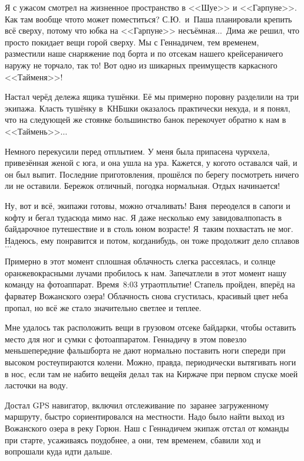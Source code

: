 Я с ужасом смотрел на жизненное пространство в <<Шуе>> и <<Гарпуне>>. Как там вообще что\sdash то может поместиться? С.Ю.~и~Паша планировали крепить всё сверху, потому что юбка на <<Гарпуне>> несъёмная$\ldots$~Дима же решил, что просто покидает вещи горой сверху. Мы с Геннадичем, тем временем, разместили наше снаряжение под борта и по отсекам нашего крейсера\mdash ничего наружу не торчало, так то! Вот одно из шикарных преимуществ каркасного <<Тайменя>>!

Настал черёд дележа ящика тушёнки. Её мы примерно поровну разделили на три экипажа. Класть тушёнку в~КНБ\sdash шки оказалось практически некуда, и я понял, что на следующей же стоянке большинство банок перекочует обратно к нам в <<Таймень>>$\ldots$

Немного перекусили перед отплытием. У меня была припасена чурчхела, привезённая женой с юга, и она ушла на ура. Кажется, у кого\sdash то оставался чай, и он был выпит. Последние приготовления, прошёлся по берегу посмотреть ничего ли не оставили. Бережок отличный, погодка нормальная. Отдых начинается!

Ну, вот и всё, экипажи готовы, можно отчаливать! Ваня~переоделся в сапоги и кофту и бегал туда\sdash сюда мимо нас. Я даже несколько ему завидовал\mdash попасть в байдарочное путешествие и в столь юном возрасте! Я~таким похвастать не мог. Надеюсь, ему понравится и потом, когда\sdash нибудь, он тоже продолжит дело сплавов$\ldots$

Примерно в этот момент сплошная облачность слегка рассеялась, и солнце оранжево\sdash красными лучами пробилось к нам. Запечатлели в этот момент нашу команду на фотоаппарат. Время~8:03 утра\mdash отплытие! Стапель пройден, вперёд на фарватер Вожанского  озера! Облачность снова сгустилась, красивый цвет неба пропал, но всё же стало значительно светлее и теплее.

Мне удалось так расположить вещи в грузовом отсеке байдарки, чтобы оставить место для ног и сумки с фотоаппаратом. Геннадичу в этом повезло меньше\mdash передние фальшборта не дают нормально поставить ноги спереди при высоком росте\mdash упираются колени. Можно, правда, периодически вытягивать ноги в нос, если там не набито вещей\mdash я делал так на Киржаче при первом спуске моей ласточки на воду.  

Достал GPS навигатор, включил отслеживание по~заранее загруженному маршруту, быстро сориентировался на местности. Надо было найти выход из Вожанского озера в реку Горюн. Наш с Геннадичем экипаж отстал от команды при старте, усаживаясь поудобнее, а они, тем временем, сбавили ход и вопрошали куда идти дальше. 

